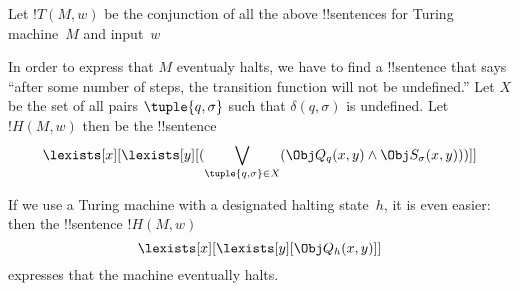 \documentclass[../../../include/open-logic-section]{subfiles}
\begin{document}

Let $!T(M, w)$ be the conjunction of all the above !!{sentence}s for Turing
machine~$M$ and input~$w$

In order to express that $M$ eventualy halts, we have to find a
!!{sentence} that says ``after some number of steps, the transition
function will not be undefined.''  Let $X$ be the set of all pairs
$\tuple{q, \sigma}$ such that $\delta(q, \sigma)$ is undefined.  Let
$!H(M, w)$ then be the !!{sentence}
\[
\lexists[x][\lexists[y][(\bigvee_{\tuple{q, \sigma} \in
      X}(\Obj Q_q(x, y) \land \Obj S_\sigma(x, y)))]]
\]

If we use a Turing machine with a designated halting state~$h$, it
is even easier: then the !!{sentence} $!H(M, w)$
\[
\lexists[x][\lexists[y][\Obj Q_h(x, y)]]
\]
expresses that the machine eventually halts.
\end{document}
